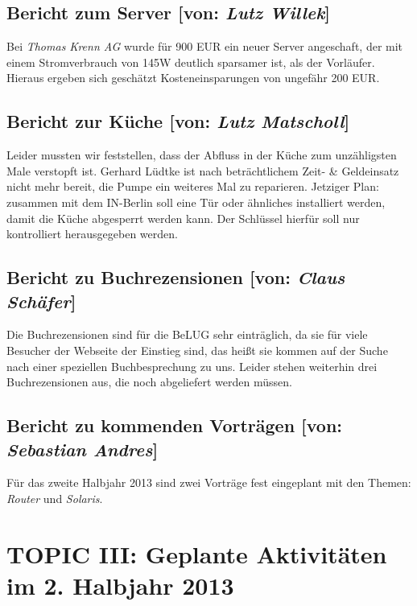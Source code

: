 \documentclass[11pt,a4paper,ngerman]{article}
\begin{document}
  \subsection{Bericht zum Server [von: 
\textcolor{hellgrau.60}{\textsl{Lutz Willek}}]}

Bei \textsl{Thomas Krenn AG} wurde für 900 EUR ein neuer Server angeschaft, der 
mit einem Stromverbrauch von 145W deutlich sparsamer ist, als der Vorläufer. 
Hieraus ergeben sich geschätzt Kosteneinsparungen von ungefähr 200 EUR.


  \subsection{Bericht zur Küche [von: 
\textcolor{hellgrau.60}{\textsl{Lutz Matscholl}}]}

Leider mussten wir feststellen, dass der Abfluss in der Küche zum unzähligsten 
Male verstopft ist. Gerhard Lüdtke ist nach beträchtlichem Zeit- \& Geldeinsatz 
nicht mehr bereit, die Pumpe ein weiteres Mal zu reparieren. Jetziger Plan: 
zusammen mit dem IN-Berlin soll eine Tür oder ähnliches installiert werden, 
damit die Küche abgesperrt werden kann. Der Schlüssel hierfür soll nur 
kontrolliert herausgegeben werden.


  \subsection{Bericht zu Buchrezensionen [von: 
\textcolor{hellgrau.60}{\textsl{Claus Schäfer}}]}

Die Buchrezensionen sind für die BeLUG sehr einträglich, da sie für viele 
Besucher der Webseite der Einstieg sind, das heißt sie kommen auf der Suche 
nach einer speziellen Buchbesprechung zu uns. Leider stehen weiterhin drei 
Buchrezensionen aus, die noch abgeliefert werden müssen.


  \subsection{Bericht zu kommenden Vorträgen [von: 
\textcolor{hellgrau.60}{\textsl{Sebastian Andres}}]}

Für das zweite Halbjahr 2013 sind zwei Vorträge fest eingeplant mit den Themen: 
\textsl{Router} und \textsl{Solaris}.


\section{TOPIC III: Geplante Aktivitäten im 2. Halbjahr 2013}
\end{document}
